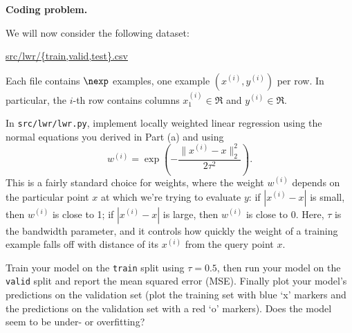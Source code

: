\item {} \textbf{Coding problem.}

We will now consider the following dataset:
\begin{center}
	\url{src/lwr/{train,valid,test}.csv}	
\end{center}

Each file contains $\nexp$ examples, one example $(x^{(i)}, y^{(i)})$ per row.
In particular, the $i$-th row contains columns $x^{(i)}_1\in\Re$ and $y^{(i)}\in\Re$.

In \texttt{src/lwr/lwr.py}, implement locally weighted linear regression
using the normal equations you derived in Part (a) and using
%
\begin{equation*}
	w^{(i)} = \exp\left(-\frac{\|x^{(i)} - x\|_2^2}{2\tau^2}\right).
\end{equation*}
%
This is a fairly standard choice for weights, where the weight $w^{(i)}$ depends on the particular point $x$ at which we’re trying to evaluate $y$: if $|x^{(i)}-x|$ is small, then $w^{(i)}$ is close to 1; if $|x^{(i)}-x|$ is large, then $w^{(i)}$ is close to 0. Here, $\tau$ is the bandwidth parameter, and it controls how quickly the weight of a training example falls off with distance of its $x^{(i)}$ from the query point $x$.

Train your model on the \texttt{train} split using $\tau = 0.5$, then run your
model on the \texttt{valid} split and report the mean squared error (MSE).
Finally plot your model's predictions on the validation set (plot the
training set with blue `x' markers and the predictions on the
validation set with a red `o' markers). Does the model seem to be under-
or overfitting?
